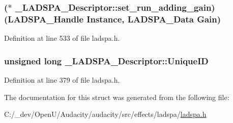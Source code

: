 \subsubsection[{\texorpdfstring{set\+\_\+run\+\_\+adding\+\_\+gain}{set_run_adding_gain}}]{($\ast$ \+\_\+\+L\+A\+D\+S\+P\+A\+\_\+\+Descriptor\+::set\+\_\+run\+\_\+adding\+\_\+gain)({\bf L\+A\+D\+S\+P\+A\+\_\+\+Handle} Instance, {\bf L\+A\+D\+S\+P\+A\+\_\+\+Data} Gain)}\hypertarget{struct___l_a_d_s_p_a___descriptor_a16fac9ef817388439f85538b364ca5e7}{}\label{struct___l_a_d_s_p_a___descriptor_a16fac9ef817388439f85538b364ca5e7}


Definition at line 533 of file ladspa.\+h.

\subsubsection[{\texorpdfstring{Unique\+ID}{UniqueID}}]{\setlength{\rightskip}{0pt plus 5cm}unsigned long \+\_\+\+L\+A\+D\+S\+P\+A\+\_\+\+Descriptor\+::\+Unique\+ID}\hypertarget{struct___l_a_d_s_p_a___descriptor_a510d7139c664c769412742f3199ab82d}{}\label{struct___l_a_d_s_p_a___descriptor_a510d7139c664c769412742f3199ab82d}


Definition at line 379 of file ladspa.\+h.



The documentation for this struct was generated from the following file\+:\begin{DoxyCompactItemize}
\item 
C\+:/\+\_\+dev/\+Open\+U/\+Audacity/audacity/src/effects/ladspa/\hyperlink{src_2effects_2ladspa_2ladspa_8h}{ladspa.\+h}\end{DoxyCompactItemize}
